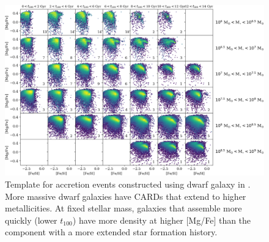 \begin{figure}[h]
    \centering
    \includegraphics[width=1\textwidth]{./figure/CARDS.jpg}
    \caption{Template for accretion events constructed using dwarf galaxy in \cite{cunninghamReadingCARDsImprint2022}. More massive dwarf galaxies have CARDs that extend to higher metallicities. At fixed stellar mass, galaxies that assemble more quickly (lower $t_{100}$) have more density at higher [Mg/Fe] than the component with a more extended star formation history.}
    \label{fig:CARDS}
\end{figure}

